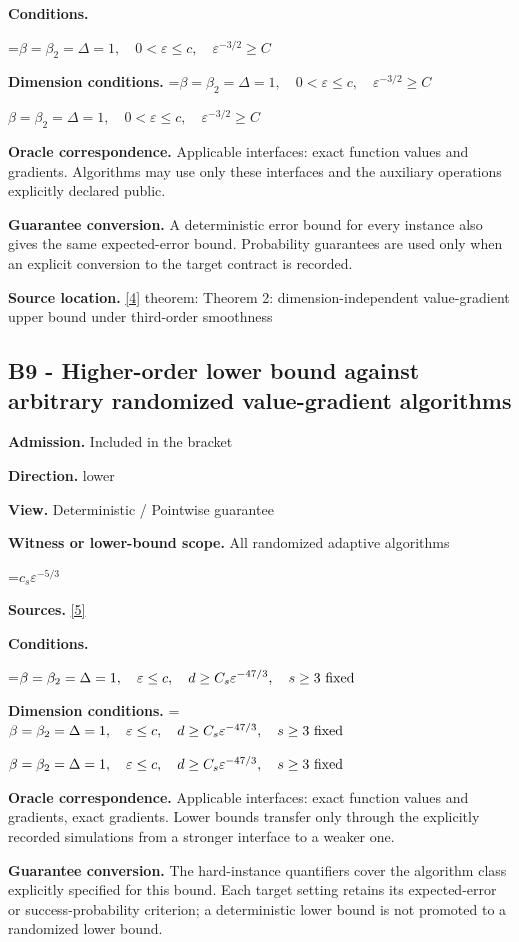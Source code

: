 \documentclass[10pt,a4paper]{article}
\newcommand{\AtlasMath}[1]{\par\begingroup\centering\setbox0=\hbox{$\displaystyle #1$}\ifdim\wd0>1.4\linewidth\typeout{ATLAS WIDE FORMULA: \the\wd0}\fi\ifdim\wd0>\linewidth\resizebox{\linewidth}{!}{\box0}\else\box0\fi\par\endgroup}
\newcommand{\AtlasInlineMath}[1]{\begingroup\setbox0=\hbox{$#1$}\ifdim\wd0>.4\linewidth\endgroup\AtlasMath{#1}\else\endgroup$#1$\fi}
\begin{document}
\textbf{Conditions.} 
\AtlasMath{\beta=\beta_2=\Delta=1,\quad0<\varepsilon\le c,\quad\varepsilon^{-3/2}\ge C}


\textbf{Dimension conditions.} \AtlasInlineMath{\beta=\beta_2=\Delta=1,\quad0<\varepsilon\le c,\quad\varepsilon^{-3/2}\ge C}

\textbf{Oracle correspondence.} Applicable interfaces: exact function values and gradients. Algorithms may use only these interfaces and the auxiliary operations explicitly declared public.

\textbf{Guarantee conversion.} A deterministic error bound for every instance also gives the same expected-error bound. Probability guarantees are used only when an explicit conversion to the target contract is recorded.

\textbf{Source location.} \href{https://proceedings.mlr.press/v70/carmon17a/carmon17a.pdf}{[4]} theorem: Theorem 2: dimension-independent value-gradient upper bound under third-order smoothness

\subsection{B9 - Higher-order lower bound against arbitrary randomized value-gradient algorithms}
\textbf{Admission.} Included in the bracket

\textbf{Direction.} lower

\textbf{View.} Deterministic / Pointwise guarantee

\textbf{Witness or lower-bound scope.} All randomized adaptive algorithms

\AtlasMath{c_s\varepsilon^{-5/3}}
\textbf{Sources.} \href{https://arxiv.org/pdf/2610.17074v2}{[5]}

\textbf{Conditions.} 
\AtlasMath{\beta=\beta_2=\Delta=1,\quad\varepsilon\le c,\quad d\ge C_s\varepsilon^{-47/3},\quad s\ge3\text{ \text{fixed}}}


\textbf{Dimension conditions.} \AtlasInlineMath{\beta=\beta_2=\Delta=1,\quad\varepsilon\le c,\quad d\ge C_s\varepsilon^{-47/3},\quad s\ge3\text{ \text{fixed}}}

\textbf{Oracle correspondence.} Applicable interfaces: exact function values and gradients, exact gradients. Lower bounds transfer only through the explicitly recorded simulations from a stronger interface to a weaker one.

\textbf{Guarantee conversion.} The hard-instance quantifiers cover the algorithm class explicitly specified for this bound. Each target setting retains its expected-error or success-probability criterion; a deterministic lower bound is not promoted to a randomized lower bound.
\end{document}
